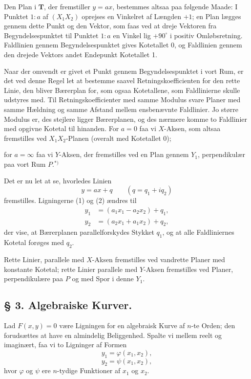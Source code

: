 \documentclass{article}
\begin{document}
Den Plan i $\mathbf{T}$, der fremstiller $y = a x$, bestemmes altsaa paa følgende Maade: I Punktet $1 : a$ af $(X_1 X_2)$ oprejses en Vinkelret af Længden $+1$; en Plan lægges gennem dette Punkt og den Vektor, som faas ved at dreje Vektoren fra Begyndelsespunktet til Punktet $1 : a$ en Vinkel lig $+90^\circ$ i positiv Omløbsretning. Faldlinien gennem Begyndelsespunktet gives Kotetallet 0, og Faldlinien gennem den drejede Vektors andet Endepunkt Kotetallet 1.

Naar der omvendt er givet et Punkt gennem Begyndelsespunktet i vort Rum, er det ved denne Regel let at bestemme saavel Retningskoefficienten for den rette Linie, den bliver Bærerplan for, som ogsaa Kotetallene, som Faldlinierne skulle udstyres med. Til Retningskoefficienter med samme Modulus svare Planer med samme Hældning og samme Afstand mellem ensbenævnte Faldlinier. Jo større Modulus er, des stejlere ligger Bærerplanen, og des nærmere komme to Faldlinier med opgivne Kotetal til hinanden. For $a = 0$ faa vi $X$-Aksen, som altsaa fremstilles ved $X_1 X_2$-Planen (overalt med Kotetallet 0);

for $a = \infty$ faa vi $Y$-Aksen, der fremstilles ved en Plan gennem $Y_1$, perpendikulær paa vort Rum $P$.${}^{*)}$

Det er nu let at se, hvorledes Linien
\[
y = ax + q \qquad (q = q_1 + i q_2)
\]
fremstilles. Ligningerne (1) og (2) ændres til
\[
\begin{aligned}
y_1 &= (a_1 x_1 - a_2 x_2) + q_1, \\
y_2 &= (a_2 x_1 + a_1 x_2) + q_2,
\end{aligned}
\]
der vise, at Bærerplanen parallelforskydes Stykket $q_1$, og at alle Faldliniernes Kotetal forøges med $q_2$.

Rette Linier, parallele med $X$-Aksen fremstilles ved vandrette Planer med konstante Kotetal; rette Linier parallele med $Y$-Aksen fremstilles ved Planer, perpendikulære paa $P$ og med Spor i denne $Y_1$.

\subsection*{§ 3. Algebraiske Kurver.}

Lad $F(x, y) = 0$ være Ligningen for en algebraisk Kurve af $n$-te Orden; den forudsættes at have en almindelig Beliggenhed. Spalte vi mellem reelt og imaginært, faa vi to Ligninger af Formen
\[
y_1 = \varphi(x_1, x_2), \tag{1}
\]
\[
y_2 = \psi(x_1, x_2), \tag{2}
\]
hvor $\varphi$ og $\psi$ ere $n$-tydige Funktioner af $x_1$ og $x_2$.
\end{document}
